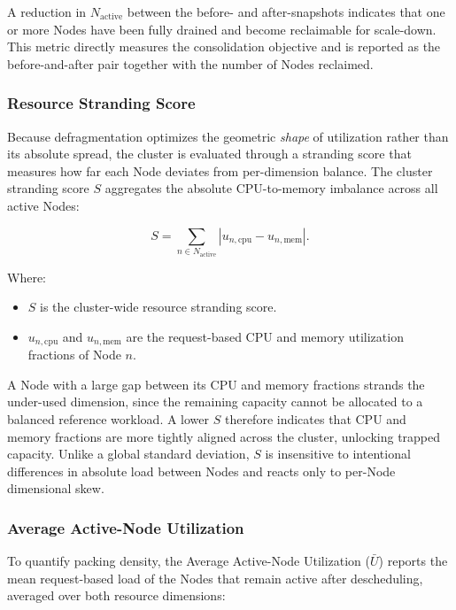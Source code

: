 A reduction in \(N_{\text{active}}\) between the before- and after-snapshots indicates that one or more Nodes have been fully drained and become reclaimable for scale-down. This metric directly measures the consolidation objective and is reported as the before-and-after pair together with the number of Nodes reclaimed.

\subsubsection{Resource Stranding Score}
\label{subsubsec:defrag_metric_stranding}
Because defragmentation optimizes the geometric \emph{shape} of utilization rather than its absolute spread, the cluster is evaluated through a stranding score that measures how far each Node deviates from per-dimension balance. The cluster stranding score \(S\) aggregates the absolute CPU-to-memory imbalance across all active Nodes:

\[
    S = \sum_{n \in N_{\text{active}}} \left|u_{n,\text{cpu}} - u_{n,\text{mem}}\right|.
\]

Where:

\begin{itemize}
    \item \(S\) is the cluster-wide resource stranding score.

    \item \(u_{n,\text{cpu}}\) and \(u_{n,\text{mem}}\) are the request-based CPU and memory utilization fractions of Node \(n\).
\end{itemize}

A Node with a large gap between its CPU and memory fractions strands the under-used dimension, since the remaining capacity cannot be allocated to a balanced reference workload. A lower \(S\) therefore indicates that CPU and memory fractions are more tightly aligned across the cluster, unlocking trapped capacity. Unlike a global standard deviation, \(S\) is insensitive to intentional differences in absolute load between Nodes and reacts only to per-Node dimensional skew.

\subsubsection{Average Active-Node Utilization}
\label{subsubsec:defrag_metric_density}
To quantify packing density, the Average Active-Node Utilization (\(\bar{U}\)) reports the mean request-based load of the Nodes that remain active after descheduling, averaged over both resource dimensions:

